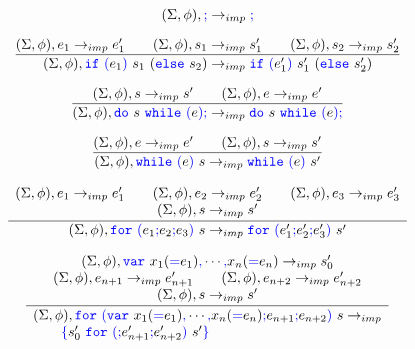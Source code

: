 \documentclass[a4paper]{article}
\newcommand{\code}[1]{\textcolor{blue}{\tt #1}}
\begin{document}
\begin{equation*}
(\Sigma, \phi), \code{;} \rightarrow_{imp} \code{;}
\end{equation*}

\begin{equation*}
\frac{
    (\Sigma, \phi), e_1 \rightarrow_{imp} e'_1 \qquad
    (\Sigma, \phi), s_1 \rightarrow_{imp} s'_1 \qquad
    (\Sigma, \phi), s_2 \rightarrow_{imp} s'_2
}{
    (\Sigma, \phi), \code{if}\ \code{(} e_1 \code{)}\ s_1\ (\code{else}\ s_2) \rightarrow_{imp} \code{if}\ \code{(} e'_1 \code{)}\ s'_1\ (\code{else}\ s'_2)
}
\end{equation*}

\begin{equation*}
\frac{
    (\Sigma, \phi), s \rightarrow_{imp} s' \qquad
    (\Sigma, \phi), e \rightarrow_{imp} e'
}{
    (\Sigma, \phi), \code{do}\ s\ \code{while}\ \code{(} e \code{);} \rightarrow_{imp} \code{do}\ s\ \code{while}\ \code{(} e \code{);}
}
\end{equation*}

\begin{equation*}
\frac{
    (\Sigma, \phi), e \rightarrow_{imp} e' \qquad
    (\Sigma, \phi), s \rightarrow_{imp} s'
}{
    (\Sigma, \phi), \code{while}\ \code{(} e \code{)}\ s \rightarrow_{imp} \code{while}\ \code{(} e \code{)}\ s'
}
\end{equation*}

\begin{equation*}
\frac{
    \begin{array}{c}
    (\Sigma, \phi), e_1 \rightarrow_{imp} e'_1 \qquad
    (\Sigma, \phi), e_2 \rightarrow_{imp} e'_2 \qquad
    (\Sigma, \phi), e_3 \rightarrow_{imp} e'_3 \\
    (\Sigma, \phi), s \rightarrow_{imp} s'
    \end{array}
}{
    (\Sigma, \phi), \code{for}\ \code{(} e_1 \code{;} e_2 \code{;} e_3 \code{)}\ s \rightarrow_{imp} \code{for}\ \code{(} e'_1 \code{;} e'_2 \code{;} e'_3 \code{)}\ s'
}
\end{equation*}

\begin{equation*}
\frac{
    \begin{array}{c}
    (\Sigma, \phi), \code{var}\ x_1 (\code{=} e_1) \code{,} \cdots \code{,} x_n (\code{=} e_n) \rightarrow_{imp} s'_0 \\
    (\Sigma, \phi), e_{n+1} \rightarrow_{imp} e'_{n+1} \qquad
    (\Sigma, \phi), e_{n+2} \rightarrow_{imp} e'_{n+2} \\
    (\Sigma, \phi), s \rightarrow_{imp} s'
    \end{array}
}{
    \begin{array}{l}
    (\Sigma, \phi), \code{for}\ \code{(} \code{var}\ x_1 (\code{=} e_1) \code{,} \cdots \code{,} x_n (\code{=} e_n) \code{;} e_{n+1} \code{;} e_{n+2} \code{)}\ s \rightarrow_{imp} \\
    \qquad \code{\{} s'_0\ \code{for}\ \code{(} \code{;} e'_{n+1} \code{;} e'_{n+2} \code{)}\ s' \code{\}}
    \end{array}
}
\end{equation*}
\end{document}
